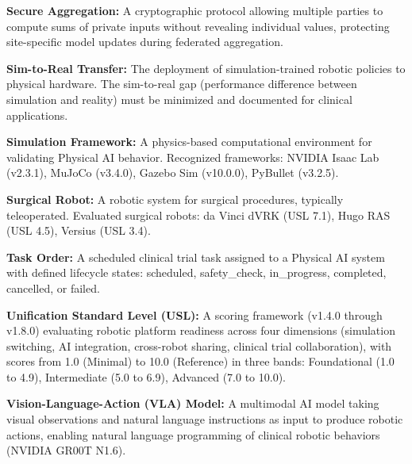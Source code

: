 \textbf{Secure Aggregation:} A cryptographic protocol allowing multiple parties to compute sums of private inputs without revealing individual values, protecting site-specific model updates during federated aggregation.

\textbf{Sim-to-Real Transfer:} The deployment of simulation-trained robotic policies to physical hardware. The sim-to-real gap (performance difference between simulation and reality) must be minimized and documented for clinical applications.

\textbf{Simulation Framework:} A physics-based computational environment for validating Physical AI behavior. Recognized frameworks: NVIDIA Isaac Lab (v2.3.1), MuJoCo (v3.4.0), Gazebo Sim (v10.0.0), PyBullet (v3.2.5).

\textbf{Surgical Robot:} A robotic system for surgical procedures, typically teleoperated. Evaluated surgical robots: da Vinci dVRK (USL 7.1), Hugo RAS (USL 4.5), Versius (USL 3.4).

\textbf{Task Order:} A scheduled clinical trial task assigned to a Physical AI system with defined lifecycle states: scheduled, safety\_check, in\_progress, completed, cancelled, or failed.

\textbf{Unification Standard Level (USL):} A scoring framework (v1.4.0 through v1.8.0) evaluating robotic platform readiness across four dimensions (simulation switching, AI integration, cross-robot sharing, clinical trial collaboration), with scores from 1.0 (Minimal) to 10.0 (Reference) in three bands: Foundational (1.0 to 4.9), Intermediate (5.0 to 6.9), Advanced (7.0 to 10.0).

\textbf{Vision-Language-Action (VLA) Model:} A multimodal AI model taking visual observations and natural language instructions as input to produce robotic actions, enabling natural language programming of clinical robotic behaviors (NVIDIA GR00T N1.6).

\clearpage
\nocite{cfr-part-50}
\printbibliography[title={Bibliography}]

